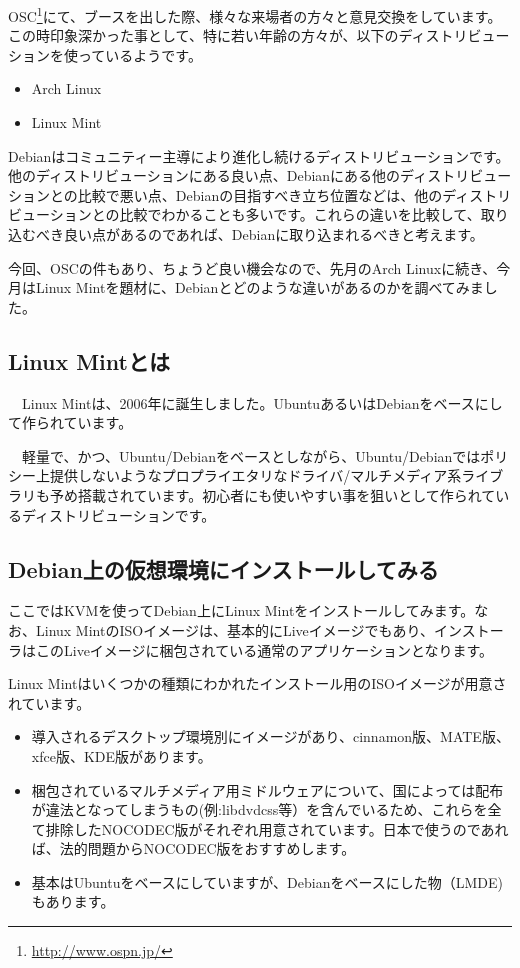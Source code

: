 \documentclass[mingoth,a4paper]{jsarticle}
\begin{document}
 OSC\footnote{\url{http://www.ospn.jp/}}にて、ブースを出した際、様々な来場者の方々と意見交換をしています。この時印象深かった事として、特に若い年齢の方々が、以下のディストリビューションを使っているようです。

 \begin{itemize}
 \item Arch Linux
 \item Linux Mint
 \end{itemize}
 
 Debianはコミュニティー主導により進化し続けるディストリビューションです。他のディストリビューションにある良い点、Debianにある他のディストリビューションとの比較で悪い点、Debianの目指すべき立ち位置などは、他のディストリビューションとの比較でわかることも多いです。これらの違いを比較して、取り込むべき良い点があるのであれば、Debianに取り込まれるべきと考えます。

 今回、OSCの件もあり、ちょうど良い機会なので、先月のArch Linuxに続き、今月はLinux Mintを題材に、Debianとどのような違いがあるのかを調べてみました。

\subsection{Linux Mintとは}

　Linux Mintは、2006年に誕生しました\cite{ref:linuxmint-history}。UbuntuあるいはDebianをベースにして作られています。

　軽量で、かつ、Ubuntu/Debianをベースとしながら、Ubuntu/Debianではポリシー上提供しないようなプロプライエタリなドライバ/マルチメディア系ライブラリも予め搭載されています。初心者にも使いやすい事を狙いとして作られているディストリビューションです。

\subsection{Debian上の仮想環境にインストールしてみる}

ここではKVMを使ってDebian上にLinux Mintをインストールしてみます。なお、Linux MintのISOイメージは、基本的にLiveイメージでもあり、インストーラはこのLiveイメージに梱包されている通常のアプリケーションとなります。

Linux Mintはいくつかの種類にわかれたインストール用のISOイメージが用意されています。

\begin{itemize}
\item 導入されるデスクトップ環境別にイメージがあり、cinnamon版、MATE版、xfce版、KDE版があります。
\item 梱包されているマルチメディア用ミドルウェアについて、国によっては配布が違法となってしまうもの(例:libdvdcss等）を含んでいるため、これらを全て排除したNOCODEC版がそれぞれ用意されています。日本で使うのであれば、法的問題からNOCODEC版をおすすめします\cite{ref:linuxmint-illeagal-prog}。
\item 基本はUbuntuをベースにしていますが、Debianをベースにした物（LMDE)もあります。
\end{itemize}
\end{document}
